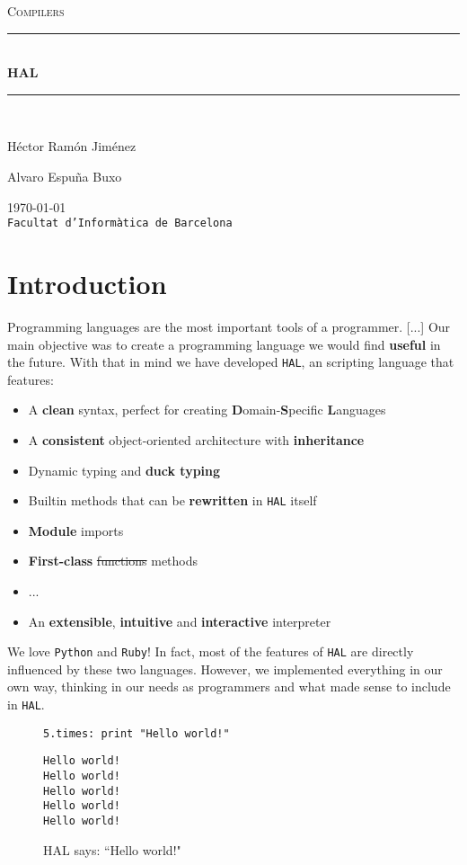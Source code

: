 \documentclass[a4paper,11pt]{article}
\begin{document}
\begin{titlepage}
\begin{center}
\textsc{\Large Compilers}
\\[1.5cm]
\rule{\linewidth}{0.5mm}
\\[0.4cm]
{\huge
\bfseries
HAL
\\[0.4cm]
}
\rule{\linewidth}{0.5mm}
\\[2.5cm]
\begin{minipage}{0.4\textwidth}
\begin{flushleft}
\large
Héctor Ramón Jiménez
\end{flushleft}
\end{minipage}
\begin{minipage}{0.4\textwidth}
\begin{flushright}
\large
Alvaro Espuña Buxo
\end{flushright}
\end{minipage}
\vfill
{\large
\today
}
\\
{\large
\texttt{Facultat d'Informàtica de Barcelona}
}
\end{center}
\end{titlepage}
\tableofcontents
\clearpage
\section{Introduction}
Programming languages are the most important tools of a programmer. [...]
Our main objective was to create a programming language we would find \textbf{useful} in the future.
  With that in mind we have developed \texttt{HAL}, an scripting language that features:
\begin{itemize}
\item
A \textbf{clean} syntax, perfect for creating \textbf{D}omain-\textbf{S}pecific \textbf{L}anguages
\item
A \textbf{consistent} object-oriented architecture with \textbf{inheritance}
\item
Dynamic typing and \textbf{duck typing}
\item
Builtin methods that can be \textbf{rewritten} in \texttt{HAL} itself
\item
\textbf{Module} imports
\item
\textbf{First-class} \st{functions} methods
\item
...
\item
An \textbf{extensible}, \textbf{intuitive} and \textbf{interactive} interpreter
\end{itemize}
We love \texttt{Python} and \texttt{Ruby}! In fact, most of the features of \texttt{HAL} are directly influenced
  by these two languages. However, we implemented everything in our own way, thinking in our
  needs as programmers and what made sense to include in \texttt{HAL}.
\begin{figure}[h!]
\begin{lstlisting}[language=hal]
5.times: print "Hello world!"
\end{lstlisting}
\begin{lstlisting}[language=output]
Hello world!
Hello world!
Hello world!
Hello world!
Hello world!
\end{lstlisting}
\caption{HAL says: ``Hello world!"}
\label{hello5}
\end{figure}
\clearpage
\end{document}
